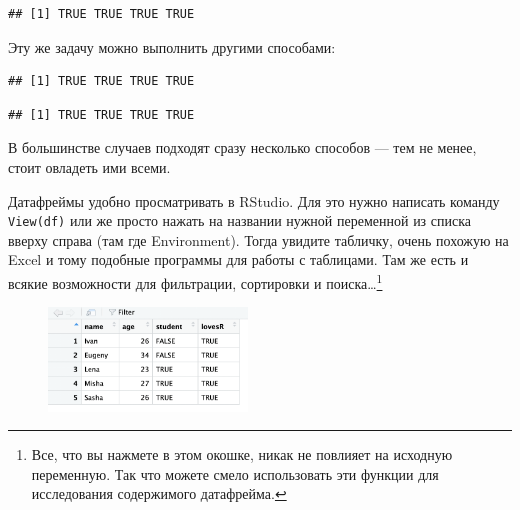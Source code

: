 \documentclass[]{book}
\newenvironment{Shaded}{\begin{snugshade}}{\end{snugshade}}
\newcommand{\KeywordTok}[1]{\textcolor[rgb]{0.13,0.29,0.53}{\textbf{#1}}}
\newcommand{\StringTok}[1]{\textcolor[rgb]{0.31,0.60,0.02}{#1}}
\newcommand{\OperatorTok}[1]{\textcolor[rgb]{0.81,0.36,0.00}{\textbf{#1}}}
\newcommand{\NormalTok}[1]{#1}
\begin{document}
\begin{verbatim}
## [1] TRUE TRUE TRUE TRUE
\end{verbatim}

Эту же задачу можно выполнить другими способами:

\begin{Shaded}
\end{Shaded}

\begin{verbatim}
## [1] TRUE TRUE TRUE TRUE
\end{verbatim}

\begin{Shaded}
\end{Shaded}

\begin{verbatim}
## [1] TRUE TRUE TRUE TRUE
\end{verbatim}

В большинстве случаев подходят сразу несколько способов --- тем не
менее, стоит овладеть ими всеми.

Датафреймы удобно просматривать в RStudio. Для это нужно написать
команду \texttt{View(df)} или же просто нажать на названии нужной
переменной из списка вверху справа (там где Environment). Тогда увидите
табличку, очень похожую на Excel и тому подобные программы для работы с
таблицами. Там же есть и всякие возможности для фильтрации, сортировки и
поиска\ldots{}\footnote{Все, что вы нажмете в этом окошке, никак не
  повлияет на исходную переменную. Так что можете смело использовать эти
  функции для исследования содержимого датафрейма.}

\begin{figure}
\centering
\includegraphics[width=2.08333in]{images/View.png}
\caption{}
\end{figure}
\end{document}
